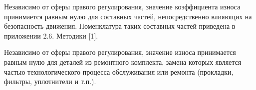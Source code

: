Независимо от сферы правого регулирования, значение коэффициента износа принимается равным нулю для составных частей, непосредственно влияющих на безопасность движения. Номенклатура таких составных частей приведена в приложении 2.6. Методики [1].

Независимо от сферы правого регулирования, значение износа принимается равным нулю для деталей из ремонтного комплекта, замена которых является частью технологического процесса обслуживания или ремонта (прокладки, фильтры, уплотнители и т.п.).  




%


